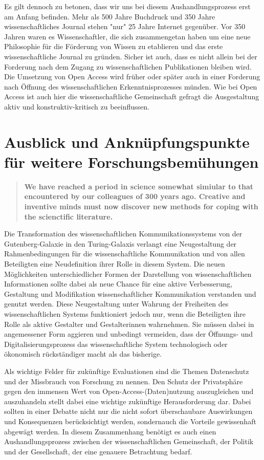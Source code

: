 Es gilt dennoch zu betonen, dass wir uns bei diesem Aushandlungsprozess erst am Anfang befinden. Mehr als 500 Jahre Buchdruck und 350 Jahre wissenschaftliches Journal stehen "nur" 25 Jahre Internet gegenüber. Vor 350 Jahren waren es Wissenschaftler, die sich zusammengetan haben um eine neue Philosophie für die Förderung von Wissen zu etablieren und das erste wissenschaftliche Journal zu gründen. Sicher ist auch, dass es nicht allein bei der Forderung nach dem Zugang zu wissenschaftlichen Publikationen bleiben wird. Die Umsetzung von Open Access wird früher oder später auch in einer Forderung nach Öffnung des wissenschaftlichen Erkenntnisprozesses münden. Wie bei Open Access ist auch hier die wissenschaftliche Gemeinschaft gefragt die Ausgestaltung aktiv und konstruktiv-kritisch zu beeinflussen.

\section{Ausblick und Anknüpfungspunkte für weitere Forschungsbemühungen}

\begin{quote}
\textbf{We have reached a period in science somewhat simiular to that encountered by our colleagues of 300 years ago. Creative and inventive minds must now discover new methods for coping with the scienctific literature.}
\end{quote} \cite{porter_1964_scientific}

Die Transformation des wissenschaftlichen Kommunikationssystems von der Gutenberg-Galaxie in den Turing-Galaxis verlangt eine Neugestaltung der Rahmenbedingungen für die wissenschaftliche Kommunikation und von allen Beteiligten eine Neudefinition ihrer Rolle in diesem System. Die neuen Möglichkeiten unterschiedlicher Formen der Darstellung von wissenschaftlichen Informationen sollte dabei als neue Chance für eine aktive Verbesserung, Gestaltung und Modifikation wissenschaftlicher Kommunikation verstanden und genutzt werden. Diese Neugestaltung unter Wahrung der Freiheiten des wissenschaftlichen Systems funktioniert jedoch nur, wenn die Beteiligten ihre Rolle als aktive Gestalter und Gestalterinnen wahrnehmen. Sie müssen dabei in angemessener Form aggieren und unbedingt vermeiden, dass der Öffnungs- und Digitalisierungsprozess das wissenschaftliche System technologisch oder ökonomisch rückständiger macht als das bisherige.

Als wichtige Felder für zukünftige Evaluationen sind die Themen Datenschutz und der Missbrauch von Forschung \cite{Fritsch_2015} zu nennen. Den Schutz der Privatsphäre gegen den immensen Wert von Open-Access-(Daten)nutzung auszugleichen und auszuhandeln stellt dabei eine wichtige zukünftige Herausforderung dar. Dabei sollten in einer Debatte nicht nur die nicht sofort überschaubare Auswirkungen und Konsequenzen berücksichtigt werden, sondernauch die Vorteile gewissenhaft abgewägt werden. In diesem Zusammenhang benötigt es auch einen Aushandlungsprozess zwischen der wissenschaftlichen Gemeinschaft, der Politik und der Gesellschaft, der eine genauere Betrachtung bedarf.

